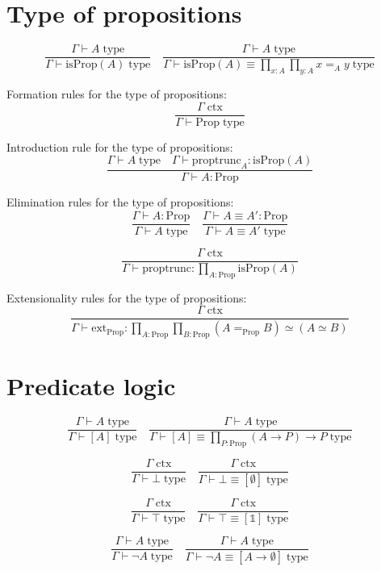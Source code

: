 \documentclass{book}
\begin{document}
\section{Type of propositions}

$$\frac{\Gamma \vdash A \; \mathrm{type}}{\Gamma \vdash \mathrm{isProp}(A) \; \mathrm{type}} \quad \frac{\Gamma \vdash A \; \mathrm{type}}{\Gamma \vdash \mathrm{isProp}(A) \equiv \prod_{x:A} \prod_{y:A} x =_A y \; \mathrm{type}}$$

Formation rules for the type of propositions:
$$\frac{\Gamma \; \mathrm{ctx}}{\Gamma \vdash \mathrm{Prop} \; \mathrm{type}}$$

Introduction rule for the type of propositions:
$$\frac{\Gamma \vdash A \; \mathrm{type} \quad \Gamma \vdash \mathrm{proptrunc}_A:\mathrm{isProp}(A)}{\Gamma \vdash A:\mathrm{Prop}}$$

Elimination rules for the type of propositions:
$$\frac{\Gamma \vdash A:\mathrm{Prop}}{\Gamma \vdash A \; \mathrm{type}} \quad \frac{\Gamma \vdash A \equiv A':\mathrm{Prop}}{\Gamma \vdash A \equiv A' \; \mathrm{type}}$$

$$\frac{\Gamma \; \mathrm{ctx}}{\Gamma \vdash \mathrm{proptrunc}:\prod_{A:\mathrm{Prop}} \mathrm{isProp}(A)}$$

Extensionality rules for the type of propositions:
$$\frac{\Gamma \; \mathrm{ctx}}{\Gamma \vdash \mathrm{ext}_{\mathrm{Prop}}:\prod_{A:\mathrm{Prop}} \prod_{B:\mathrm{Prop}} (A =_{\mathrm{Prop}} B) \simeq (A \simeq B)}$$

\section{Predicate logic}

$$\frac{\Gamma \vdash A \; \mathrm{type}}{\Gamma \vdash [A] \; \mathrm{type}} \quad \frac{\Gamma \vdash A \; \mathrm{type}}{\Gamma \vdash [A] \equiv \prod_{P:\mathrm{Prop}} (A \to P) \to P \; \mathrm{type}}$$

$$\frac{\Gamma \; \mathrm{ctx}}{\Gamma \vdash \bot \; \mathrm{type}} \quad \frac{\Gamma \; \mathrm{ctx}}{\Gamma \vdash \bot \equiv [\emptyset] \; \mathrm{type}}$$

$$\frac{\Gamma \; \mathrm{ctx}}{\Gamma \vdash \top \; \mathrm{type}} \quad \frac{\Gamma \; \mathrm{ctx}}{\Gamma \vdash \top \equiv [\mathbb{1}] \; \mathrm{type}}$$

$$\frac{\Gamma \vdash A \; \mathrm{type}}{\Gamma \vdash \neg A \; \mathrm{type}} \quad \frac{\Gamma \vdash A \; \mathrm{type}}{\Gamma \vdash \neg A \equiv [A \to \emptyset] \; \mathrm{type}}$$
\end{document}
